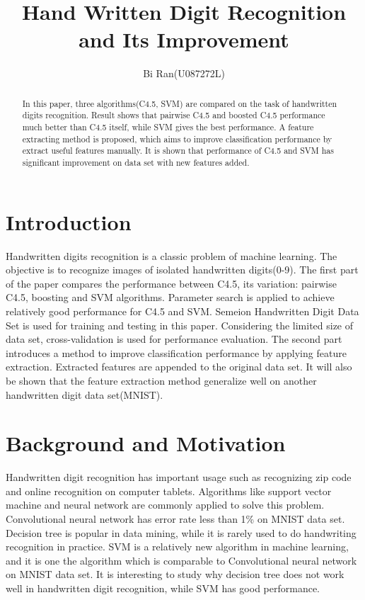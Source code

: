 \documentclass[a4paper,11pt]{article}
\author{Bi Ran(U087272L)}
\title{Hand Written Digit Recognition and Its Improvement}
\begin{document}
\maketitle
\begin{abstract}
In this paper, three algorithms(C4.5, SVM) are compared on the task of handwritten digits recognition. Result shows that pairwise C4.5 and boosted C4.5 performance much better than C4.5 itself, while SVM gives the best performance. A feature extracting method is proposed, which aims to improve classification performance by extract useful features manually. It is shown that performance of C4.5 and SVM has significant improvement on data set with new features added.
\end{abstract}
\section{Introduction}
 Handwritten digits recognition is a classic problem of machine learning. The objective is to recognize images of isolated handwritten digits(0-9).
 The first part of the paper compares the performance between C4.5, its variation: pairwise C4.5, boosting and SVM algorithms. Parameter search is applied to achieve relatively good performance for C4.5 and SVM. Semeion Handwritten Digit Data Set is used for training and testing in this paper. Considering the limited size of data set, cross-validation is used for performance evaluation. The second part introduces a method to improve classification performance by applying feature extraction. Extracted features are appended to the original data set. It will also be shown that the feature extraction method generalize well on another handwritten digit data set(MNIST).
\section{Background and Motivation}
Handwritten digit recognition has important usage such as recognizing zip code and online recognition on computer tablets. Algorithms like support vector machine and neural network are commonly applied to solve this problem. Convolutional neural network has error rate less than 1\% on MNIST data set\cite{lecun98}. \\
Decision tree is popular in data mining, while it is rarely used to do handwriting recognition in practice. SVM is a relatively new algorithm in machine learning, and it is one the algorithm which is comparable to Convolutional neural network on MNIST data set\cite{lecun98}. It is interesting to study why decision tree does not work well in handwritten digit recognition, while SVM has good performance.
\end{document}

